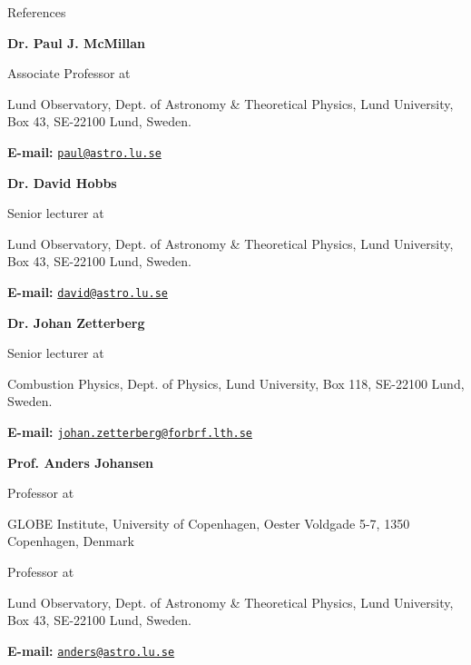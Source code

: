 
\prefix{}
\begin{rubric}{References}


	\entry*[1. ]%
	\textbf{Dr. Paul J. McMillan}\par
	Associate Professor at\par
	Lund Observatory, Dept. of Astronomy \& Theoretical Physics, Lund University, Box 43, SE-22100 Lund, Sweden. \par \textbf{E-mail:} \texttt{\href{mailto:paul@astro.lu.se}{paul@astro.lu.se}}
	\vspace{1pt}
	

	\entry*[2. ]%
	\textbf{Dr. David Hobbs}\par
	Senior lecturer at\par
	Lund Observatory, Dept. of Astronomy \& Theoretical Physics, Lund University, Box 43, SE-22100 Lund, Sweden. \par \textbf{E-mail:} \texttt{\href{mailto:david@astro.lu.se}{david@astro.lu.se}}
	\vspace{1pt}
	

	\entry*[3. ]%
	\textbf{Dr. Johan Zetterberg}\par
	Senior lecturer at\par
	Combustion Physics, Dept. of Physics, Lund University, Box 118, SE-22100 Lund, Sweden. \par \textbf{E-mail:} \texttt{\href{mailto:johan.zetterberg@forbrf.lth.se}{johan.zetterberg@forbrf.lth.se}}
	\vspace{1pt}
	

	\entry*[4. ]%
	\textbf{Prof. Anders Johansen}\par
	Professor at\par
	GLOBE Institute, University of Copenhagen, Oester Voldgade 5-7, 1350 Copenhagen, Denmark \par
	Professor at\par
	Lund Observatory, Dept. of Astronomy \& Theoretical Physics, Lund University, Box 43, SE-22100 Lund, Sweden. \par \textbf{E-mail:} \texttt{\href{mailto:anders@astro.lu.se}{anders@astro.lu.se}}
	\vspace{1pt}
\end{rubric}